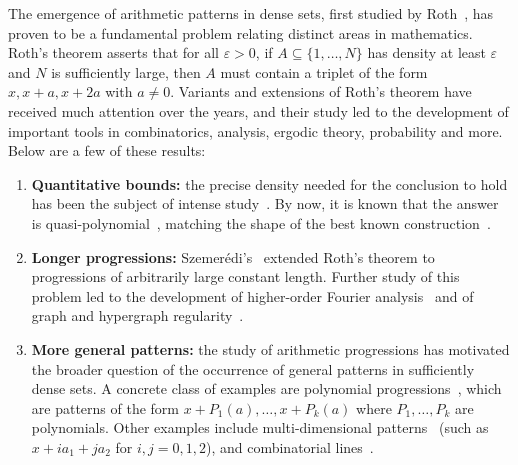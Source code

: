 \documentclass[10pt,a4paper]{amsart}
\newcommand\eps{\varepsilon}
\begin{document}
The emergence of arithmetic patterns in dense sets, first studied by Roth~\cite{Roth}, has proven to be a fundamental problem relating distinct areas in mathematics. Roth's theorem asserts that for all $\eps>0$, if $A\subseteq \{1,\ldots,N\}$ has density at least $\eps$ and $N$ is sufficiently large, then $A$ must contain a triplet of the form $x,x+a,x+2a$ with $a\neq 0$. Variants and extensions of Roth's theorem have received much attention over the years, and their study led to the development of important tools in combinatorics, analysis, ergodic theory, probability and more. Below are a few of these results:
\begin{enumerate}
    \item {\bf Quantitative bounds:} the precise density needed for the conclusion to hold has been the subject of intense study~\cite{Bourgain1999,Bourgain2008,Sanders2011,BloomSisask2019,BloomSisask2020,KelleyMeka2023}. By now, it is known that the answer is quasi-polynomial~\cite{KelleyMeka2023,BloomSisask2023}, matching the shape of the best known construction~\cite{Behrend1946,ElsholtzHunterProskeSauermann2024}.
    \item {\bf Longer progressions:} Szemer\'edi's~\cite{Szemeredi1975} extended Roth's theorem to progressions of arbitrarily large constant length. Further study of this problem led to the
    development of higher-order Fourier analysis~\cite{Gowers1998,Gowers2001} and of graph and hypergraph regularity~\cite{Szemeredi1978,RuzsaSzemeredi1978,Gowers2007}.
    \item {\bf More general patterns:} the study of arithmetic progressions has motivated the broader question of the occurrence of general patterns in sufficiently dense sets. A concrete class of examples are polynomial progressions~\cite{BergelsonLeibman1996}, which are patterns of the form $x+P_1(a),\ldots,x+P_k(a)$ where $P_1,\ldots,P_k$ are polynomials. Other examples include multi-dimensional patterns~\cite{FurstenbergKatznelson1978,Gowers2007} (such as $x+ia_1+ja_2$ for $i,j=0,1,2$), and combinatorial lines~\cite{FurstenbergKatznelson1991,Polymath2012,BKLMDHJ}.
\end{enumerate}
\end{document}
